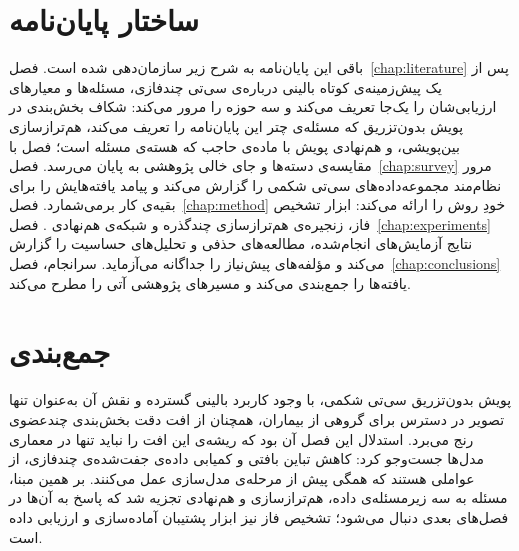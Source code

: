 \section{ساختار پایان‌نامه}
\label{sec:thesis-structure}

باقی این پایان‌نامه به شرح زیر سازمان‌دهی شده است. فصل~\ref{chap:literature} پس از یک پیش‌زمینه‌ی کوتاه بالینی درباره‌ی سی‌تی چندفازی، مسئله‌ها و معیارهای ارزیابی‌شان را یک‌جا تعریف می‌کند و سه حوزه را مرور می‌کند: شکاف بخش‌بندی در پویش بدون‌تزریق که مسئله‌ی چتر این پایان‌نامه را تعریف می‌کند، هم‌ترازسازی بین‌پویشی، و هم‌نهادی پویش با ماده‌ی حاجب که هسته‌ی مسئله است؛ فصل با مقایسه‌ی دسته‌ها و جای خالی پژوهشی به پایان می‌رسد. فصل~\ref{chap:survey} مرور نظام‌مند مجموعه‌داده‌های سی‌تی شکمی را گزارش می‌کند و پیامد یافته‌هایش را برای بقیه‌ی کار برمی‌شمارد. فصل~\ref{chap:method} خودِ روش را ارائه می‌کند: ابزار تشخیص فاز، زنجیره‌ی هم‌ترازسازی چندگذره و شبکه‌ی هم‌نهادی . فصل~\ref{chap:experiments} 
نتایج آزمایش‌های انجام‌شده، 
مطالعه‌های حذفی و تحلیل‌های حساسیت را گزارش می‌کند و مؤلفه‌های پیش‌نیاز را جداگانه می‌آزماید. سرانجام، فصل~\ref{chap:conclusions} یافته‌ها را جمع‌بندی می‌کند و مسیرهای پژوهشی آتی را مطرح می‌کند.

\section{جمع‌بندی}
\label{sec:intro-summary}

پویش بدون‌تزریق سی‌تی شکمی، با وجود کاربرد بالینی گسترده و نقش آن به‌عنوان تنها تصویر در دسترس برای گروهی از بیماران، همچنان از افت دقت بخش‌بندی چندعضوی رنج می‌برد. استدلال این فصل آن بود که ریشه‌ی این افت را نباید تنها در معماری مدل‌ها جست‌وجو کرد: کاهش تباین بافتی و کمیابی داده‌ی جفت‌شده‌ی چندفازی، از عواملی هستند که همگی پیش از مرحله‌ی مدل‌سازی عمل می‌کنند. بر همین مبنا، مسئله به سه زیرمسئله‌ی داده، هم‌ترازسازی و هم‌نهادی تجزیه شد که پاسخ به آن‌ها در فصل‌های بعدی دنبال می‌شود؛ تشخیص فاز نیز ابزار پشتیبان آماده‌سازی و ارزیابی داده است.
